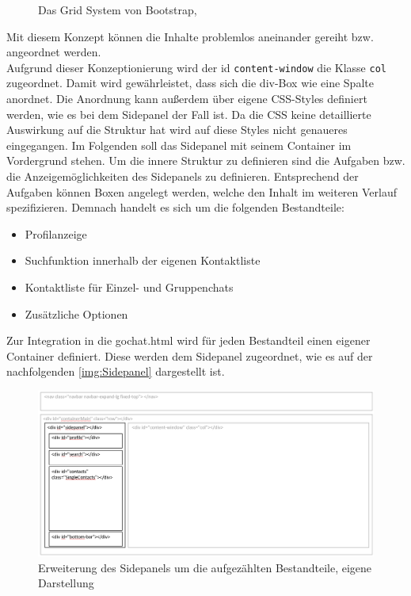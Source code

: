 \documentclass[a4paper,titlepage,halfparskip,12pt]{scrreprt}
\begin{document}
\begin{onehalfspacing}
\begin{figure}[h]
	\caption{Das Grid System von Bootstrap, \cite{krause2016introducing}}
	\label{img:GridSystem}
\end{figure}
Mit diesem Konzept können die Inhalte problemlos aneinander gereiht bzw. angeordnet werden. \cite{krause2016introducing}\\
Aufgrund dieser Konzeptionierung wird der id \texttt{content-window} die Klasse \texttt{col} zugeordnet. Damit wird gewährleistet, dass sich die div-Box wie eine Spalte anordnet. Die Anordnung kann außerdem über eigene CSS-Styles definiert werden, wie es bei dem Sidepanel der Fall ist. Da die CSS keine detaillierte Auswirkung auf die Struktur hat wird auf diese Styles nicht genaueres eingegangen. Im Folgenden soll das Sidepanel mit seinem Container im Vordergrund stehen. Um die innere Struktur zu definieren sind die Aufgaben bzw. die Anzeigemöglichkeiten des Sidepanels zu definieren. Entsprechend der Aufgaben können Boxen angelegt werden, welche den Inhalt im weiteren Verlauf spezifizieren. Demnach handelt es sich um die folgenden Bestandteile:
\begin{itemize}
	\item Profilanzeige
	\item Suchfunktion innerhalb der eigenen Kontaktliste
	\item Kontaktliste für Einzel- und Gruppenchats
	\item Zusätzliche Optionen
\end{itemize}
Zur Integration in die gochat.html wird für jeden Bestandteil einen eigener Container definiert. Diese werden dem Sidepanel zugeordnet, wie es auf der nachfolgenden \autoref{img:Sidepanel} dargestellt ist.
\begin{figure}[h]
	\centering
	\includegraphics[scale=0.55]{images/BasisStruktur1GochatSidepanel}
	\caption{Erweiterung des Sidepanels um die aufgezählten Bestandteile, eigene Darstellung}
	\label{img:Sidepanel}
\end{figure}

\end{onehalfspacing}
\end{document}
